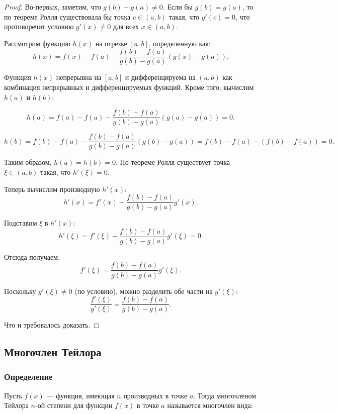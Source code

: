     \begin{proof}
    Во-первых, заметим, что \( g(b) - g(a) \neq 0 \). Если бы \( g(b) = g(a) \), то по теореме Ролля существовала бы точка \( c \in (a, b) \) такая, что \( g'(c) = 0 \), что противоречит условию \( g'(x) \neq 0 \) для всех \( x \in (a, b) \).
    
    Рассмотрим функцию \( h(x) \) на отрезке \( [a, b] \), определенную как:
    \[
    h(x) = f(x) - f(a) - \frac{f(b) - f(a)}{g(b) - g(a)} (g(x) - g(a)).
    \]
    
    Функция \( h(x) \) непрерывна на \( [a, b] \) и дифференцируема на \( (a, b) \) как комбинация непрерывных и дифференцируемых функций. Кроме того, вычислим \( h(a) \) и \( h(b) \):
    
    \[
    h(a) = f(a) - f(a) - \frac{f(b) - f(a)}{g(b) - g(a)} (g(a) - g(a)) = 0.
    \]
    
    \[
    h(b) = f(b) - f(a) - \frac{f(b) - f(a)}{g(b) - g(a)} (g(b) - g(a)) = f(b) - f(a) - (f(b) - f(a)) = 0.
    \]
    
    Таким образом, \( h(a) = h(b) = 0 \). По теореме Ролля существует точка \( \xi \in (a, b) \) такая, что \( h'(\xi) = 0 \).
    
    Теперь вычислим производную \( h'(x) \):
    \[
    h'(x) = f'(x) - \frac{f(b) - f(a)}{g(b) - g(a)} g'(x).
    \]
    
    Подставим \( \xi \) в \( h'(x) \):
    \[
    h'(\xi) = f'(\xi) - \frac{f(b) - f(a)}{g(b) - g(a)} g'(\xi) = 0.
    \]
    
    Отсюда получаем:
    \[
    f'(\xi) = \frac{f(b) - f(a)}{g(b) - g(a)} g'(\xi).
    \]
    
    Поскольку \( g'(\xi) \neq 0 \) (по условию), можно разделить обе части на \( g'(\xi) \):
    \[
    \frac{f'(\xi)}{g'(\xi)} = \frac{f(b) - f(a)}{g(b) - g(a)}.
    \]
    
    Что и требовалось доказать.
    \end{proof}


\subsection{Многочлен Тейлора}

\subsubsection{Определение}
Пусть \( f(x) \) — функция, имеющая \( n \) производных в точке \( a \). Тогда многочленом Тейлора \( n \)-ой степени для функции \( f(x) \) в точке \( a \) называется многочлен вида:

